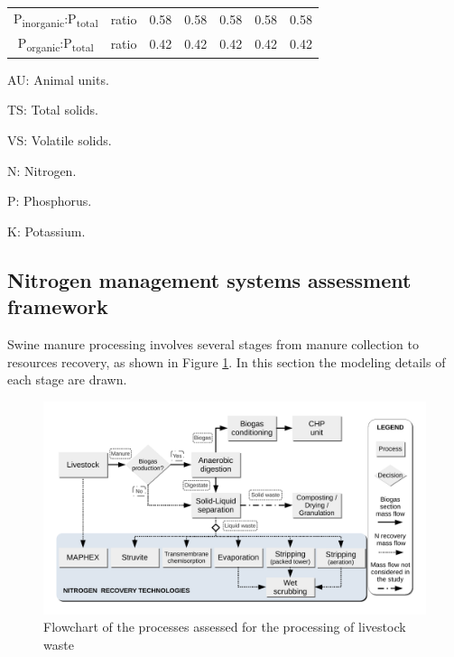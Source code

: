 \begin{refsection}[referencesCh6]
\begin{table}[h]
{\begin{threeparttable}
\begin{tabular}{@{}ccccccc@{}}
				P\textsubscript{inorganic}:P\textsubscript{total} & ratio     & 0.58          & 0.58          & 0.58 & 0.58            & 0.58                   \\
				P\textsubscript{organic}:P\textsubscript{total}   & ratio     & 0.42          & 0.42          & 0.42 & 0.42            & 0.42                   \\ \bottomrule
			\end{tabular}
			\begin{tablenotes}
				\item AU: Animal units.
				\item TS: Total solids.
				\item VS: Volatile solids.
				\item N: Nitrogen.
				\item P: Phosphorus.
				\item K: Potassium.
			\end{tablenotes}
		\end{threeparttable}
	}
\end{table}

\subsection{Nitrogen management systems assessment framework} \label{section:NitrogenManagModels}
Swine manure processing involves several stages from manure collection to resources recovery, as shown in Figure \ref{fig:techs_diagrams}. In this section the modeling details of each stage are drawn.
\begin{figure}[h]
	\centering
		\includegraphics[width=0.75\linewidth, trim={1cm 1cm 1cm 1cm},clip]{gfx/Chapter6/Process_Flowsheet2.pdf} 
		\caption{Flowchart of the processes assessed for the processing of livestock waste}
		\label{fig:techs_diagrams}
	\end{figure}


\end{refsection}
